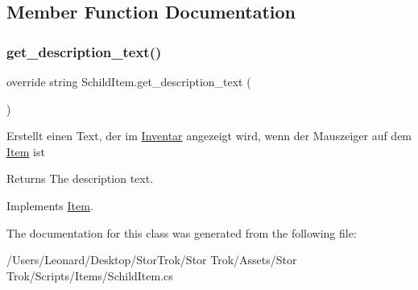 \subsection{Member Function Documentation}
\mbox{\label{class_schild_item_a6e09e58ec5afc082636c1a9b4b715613}} 
\subsubsection{\texorpdfstring{get\+\_\+description\+\_\+text()}{get\_description\_text()}}
{\footnotesize\ttfamily override string Schild\+Item.\+get\+\_\+description\+\_\+text (\begin{DoxyParamCaption}{ }\end{DoxyParamCaption})\hspace{0.3cm}{\ttfamily [virtual]}}



Erstellt einen Text, der im \hyperlink{class_inventar}{Inventar} angezeigt wird, wenn der Mauszeiger auf dem \hyperlink{class_item}{Item} ist 

\begin{DoxyReturn}{Returns}
The description text.
\end{DoxyReturn}


Implements \hyperlink{class_item_ab868f8ccad92378f7352e3a9e0f755ff}{Item}.



The documentation for this class was generated from the following file\+:\begin{DoxyCompactItemize}
\item 
/\+Users/\+Leonard/\+Desktop/\+Stor\+Trok/\+Stor Trok/\+Assets/\+Stor Trok/\+Scripts/\+Items/Schild\+Item.\+cs\end{DoxyCompactItemize}

